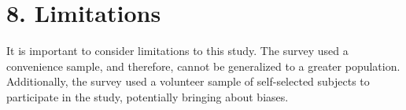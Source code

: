 \documentclass[11pt]{article} %
\begin{document}
\section{8. Limitations }

It is important to consider limitations to this study. The survey used a convenience sample, and 
therefore, cannot be generalized to a greater population. Additionally, the survey used a volunteer sample of 
self-selected subjects to participate in the study, potentially bringing about biases.
\end{document}
